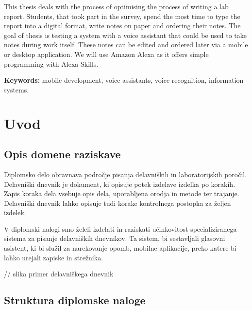 \documentclass[a4paper, 12pt]{book}
\newcommand{\tkeywordsEn}{mobile development, voice assistants, voice recognition, information systems}
\newcommand{\clearemptydoublepage}{\newpage{\pagestyle{empty}\cleardoublepage}}
\begin{document}
\noindent This thesis deals with the process of optimising the process of writing a lab report.
Students, that took part in the survey, spend the most time to type the report into a digital format, write notes on paper and ordering their notes.
The goal of thesis is testing a system with a voice assistant that could be used to take notes during work itself.
These notes can be edited and ordered later via a mobile or desktop application.
We will use Amazon Alexa as it offers simple programming with Alexa Skills.
\bigskip

\noindent\textbf{Keywords:} \tkeywordsEn.
\clearemptydoublepage

\mainmatter
\setcounter{page}{1}
\pagestyle{fancy}

\chapter{Uvod}
\section{Opis domene raziskave}

Diplomsko delo obravnava področje pisanja delavniških in laboratorijskih poročil.
Delavniški dnevnik je dokument, ki opisuje potek izdelave izdelka po korakih.
Zapis koraka dela vsebuje opis dela, uporabljena orodja in metode ter trajanje.
Delavniški dnevnik lahko opisuje tudi korake kontrolnega postopka za željen izdelek.

V diplomski nalogi smo želeli izdelati in raziskati učinkovitost specializiranega sistema za pisanje delavniških dnevnikov.
Ta sistem, bi sestavljali glasovni asistent, ki bi služil za narekovanje opomb, mobilne aplikacije, preko katere bi lahko urejali zapiske in strežnika.

// slika primer delavniškega dnevnik



\section{Struktura diplomske naloge}
\end{document}
